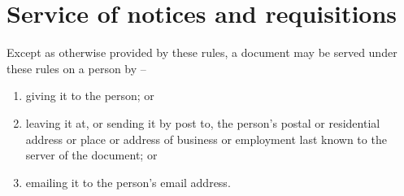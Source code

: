 \section{Service of notices and requisitions}
\label{rule:notices}

Except as otherwise provided by these rules, a document may be served under these rules on a person by --
\begin{enumerate}
	\item giving it to the person; or
	\item leaving it at, or sending it by post to, the person's postal or residential address or place or address of business or employment last known to the server of the document; or
	\item emailing it to the person's email address.
\end{enumerate}
